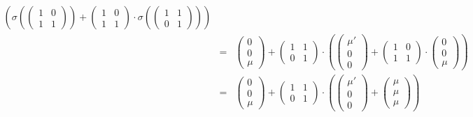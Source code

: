 \begin{eqnarray*}
\left(
	\sigma\left(
		\left(\begin{matrix} 1 & 0 \\ 1 & 1 \end{matrix}\right)
	\right) +
	\left(\begin{matrix} 1 & 0 \\ 1 & 1 \end{matrix}\right)\cdot
	\sigma\left(
		\left(\begin{matrix} 1 & 1 \\ 0 & 1 \end{matrix}\right)
	\right)
\right)\\ 
&=&
\left(\begin{matrix} 0 \\ 0 \\ \mu \end{matrix}\right)
+
\left(\begin{matrix} 1 & 1 \\ 0 & 1 \end{matrix}\right) \cdot
\left(
	\left(\begin{matrix} \mu' \\ 0 \\ 0 \end{matrix}\right)
	+
	\left(\begin{matrix} 1 & 0 \\ 1 & 1 \end{matrix}\right)\cdot
	\left(\begin{matrix} 0 \\ 0 \\ \mu \end{matrix}\right)
\right)\\ 
&=&
\left(\begin{matrix} 0 \\ 0 \\ \mu \end{matrix}\right)
+
\left(\begin{matrix} 1 & 1 \\ 0 & 1 \end{matrix}\right) \cdot
\left(
	\left(\begin{matrix} \mu' \\ 0 \\ 0 \end{matrix}\right)
	+
	\left(\begin{matrix} \mu \\ \mu \\ \mu \end{matrix}\right)
\right)\\ 

\end{eqnarray*}
